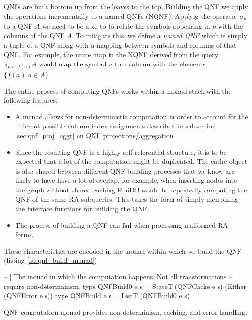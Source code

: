 QNFs are built bottom up from the leaves to the top.  Building the QNF
we apply the operations incrementally to a named QNFs (NQNF).  Applyig
the operator \(\sigma_p\) to a QNF \(A\) we need to be able to to
relate the symbols appearing in \(p\) with the columns of the QNF
\(A\). To mitigate this, we define a \emph{named QNF} which is simply a
tuple of a QNF along with a mapping between symbols and columns of
that QNF.  For example, the name map in the NQNF derived from the
query \(\pi_{n \mapsto f(a)} A\) would map the symbol \(n\) to a
column with the elements \(\{f(a) | a \in A\}\).

The entire process of computing QNFs works within a monad stack with
the following features:

\begin{itemize}
\item A  monad allows for non-deterministic computation in
  order to account for the different possible column index assignments
  described in subsection \ref{sec:qnf_proj_aggr} on QNF
  projections/aggregation.
\item Since the resulting QNF is a highly self-referential structure,
  it is to be expected that a lot of the computation might be
  duplicated. The cache object is also shared between different QNF
  building processes that we know are likely to have have a lot of
  overlap, for example, when inserting nodes into the graph without
  shared caching FluiDB would be repeatedly computing the QNF of the
  same RA subqueries. This takes the form of simply memoizing the
  interface functions for building the QNF.
\item The process of building a QNF can fail when processing malformed
  RA forms.
\end{itemize}

These characteristics are encoded in the monad within which we build
the QNF (listing \ref{lst:qnf_build_monad})

\begin{code}
  \begin{haskellcode}
    -- | The monad in which the computation happens. Not all transformations
    -- require non-determninsm.
    type QNFBuild0 e s = StateT (QNFCache e s) (Either (QNFError e s))
    type QNFBuild e s = ListT (QNFBuild0 e s)
  \end{haskellcode}
  \caption{\label{lst:qnf_build_monad}QNF computation monad provides
    non-determinism, caching, and error handling.}
\end{code}


